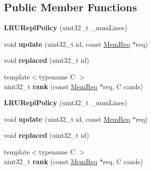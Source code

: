 \subsection*{Public Member Functions}
\begin{DoxyCompactItemize}
\item 
\hypertarget{classLRUReplPolicy_a5b56dfdf924617f38a9ce0c40eee4531}{{\bfseries L\-R\-U\-Repl\-Policy} (uint32\-\_\-t \-\_\-num\-Lines)}\label{classLRUReplPolicy_a5b56dfdf924617f38a9ce0c40eee4531}

\item 
\hypertarget{classLRUReplPolicy_a8f0aaeb531fb610a3411b986904de164}{void {\bfseries update} (uint32\-\_\-t id, const \hyperlink{structMemReq}{Mem\-Req} $\ast$req)}\label{classLRUReplPolicy_a8f0aaeb531fb610a3411b986904de164}

\item 
\hypertarget{classLRUReplPolicy_a86764b8fbec69f372916587021fc03e0}{void {\bfseries replaced} (uint32\-\_\-t id)}\label{classLRUReplPolicy_a86764b8fbec69f372916587021fc03e0}

\item 
\hypertarget{classLRUReplPolicy_a1fc2a785e3066a2f6aa1a19c13451f8e}{{\footnotesize template$<$typename C $>$ }\\uint32\-\_\-t {\bfseries rank} (const \hyperlink{structMemReq}{Mem\-Req} $\ast$req, C cands)}\label{classLRUReplPolicy_a1fc2a785e3066a2f6aa1a19c13451f8e}

\item 
\hypertarget{classLRUReplPolicy_a5b56dfdf924617f38a9ce0c40eee4531}{{\bfseries L\-R\-U\-Repl\-Policy} (uint32\-\_\-t \-\_\-num\-Lines)}\label{classLRUReplPolicy_a5b56dfdf924617f38a9ce0c40eee4531}

\item 
\hypertarget{classLRUReplPolicy_a8f0aaeb531fb610a3411b986904de164}{void {\bfseries update} (uint32\-\_\-t id, const \hyperlink{structMemReq}{Mem\-Req} $\ast$req)}\label{classLRUReplPolicy_a8f0aaeb531fb610a3411b986904de164}

\item 
\hypertarget{classLRUReplPolicy_a86764b8fbec69f372916587021fc03e0}{void {\bfseries replaced} (uint32\-\_\-t id)}\label{classLRUReplPolicy_a86764b8fbec69f372916587021fc03e0}

\item 
\hypertarget{classLRUReplPolicy_a1fc2a785e3066a2f6aa1a19c13451f8e}{{\footnotesize template$<$typename C $>$ }\\uint32\-\_\-t {\bfseries rank} (const \hyperlink{structMemReq}{Mem\-Req} $\ast$req, C cands)}\label{classLRUReplPolicy_a1fc2a785e3066a2f6aa1a19c13451f8e}

\end{DoxyCompactItemize}
